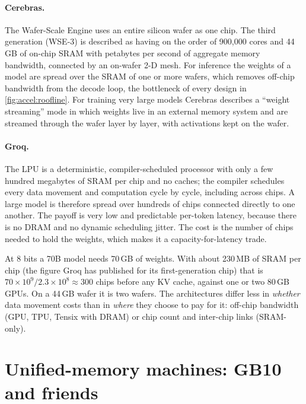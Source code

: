 \paragraph{Cerebras.} The Wafer-Scale Engine uses an entire silicon wafer as one chip. The
third generation (WSE-3) is described as having on the order of 900,000 cores and 44\,GB of on-chip
SRAM with petabytes per second of aggregate memory bandwidth, connected by an on-wafer 2-D mesh.
For inference the weights of a model are spread over the SRAM of one or more wafers, which
removes off-chip bandwidth from the decode loop, the bottleneck of every design in
\cref{fig:accel:roofline}. For training very large models Cerebras describes a ``weight streaming''
mode in which weights live in an external memory system and are streamed through the wafer layer by
layer, with activations kept on the wafer.

\paragraph{Groq.} The LPU is a deterministic, compiler-scheduled processor with only a few hundred
megabytes of SRAM per chip and no caches; the compiler schedules every data movement and
computation cycle by cycle, including across chips. A large model is therefore spread over hundreds
of chips connected directly to one another. The payoff is very low and predictable per-token latency,
because there is no DRAM and no dynamic scheduling jitter. The cost is the number of chips needed
to hold the weights, which makes it a capacity-for-latency trade.

\begin{napkinmath}
At 8 bits a 70B model needs 70\,GB of weights. With about 230\,MB of SRAM per chip (the figure
Groq has published for its first-generation chip) that is $70\times10^9/2.3\times10^8\approx 300$
chips before any KV cache, against one or two 80\,GB GPUs. On a 44\,GB wafer it is two wafers. The
architectures differ less in \emph{whether} data movement costs than in \emph{where} they choose
to pay for it: off-chip bandwidth (GPU, TPU, Tensix with DRAM) or chip count and inter-chip links
(SRAM-only).
\end{napkinmath}

\section{Unified-memory machines: GB10 and friends}\label{sec:accel:gb10}


